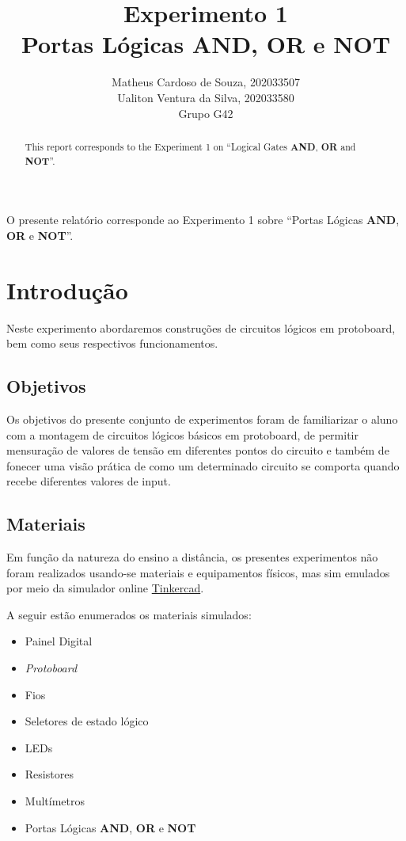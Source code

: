 \documentclass[12pt]{article}
\title{Experimento 1\\
Portas Lógicas AND, OR e NOT}
\author{Matheus Cardoso de Souza, 202033507\\
        Ualiton Ventura da Silva, 202033580\\
        Grupo G42
}
\begin{document}
 
\maketitle

 \begin{abstract}
   This report corresponds to the Experiment 1 on ``Logical Gates \textbf{AND}, \textbf{OR} and \textbf{NOT}''.
 \end{abstract}
    
 \begin{resumo} 
  O presente relatório corresponde ao Experimento 1 sobre ``Portas Lógicas \textbf{AND}, \textbf{OR} e \textbf{NOT}''.
 \end{resumo}


\section{Introdução}
\label{sec:Introducao}


Neste experimento abordaremos construções de circuitos lógicos em protoboard, bem como seus respectivos funcionamentos.

\subsection{Objetivos}
\label{sec:Objetivos}

Os objetivos do presente conjunto de experimentos foram de familiarizar o aluno
com a montagem de circuitos lógicos básicos em protoboard, de permitir
mensuração de valores de tensão em diferentes pontos do circuito e também de
fonecer uma visão prática de como um determinado circuito se comporta quando
recebe diferentes valores de input.

\subsection{Materiais} 
\label{sec:Materiais}
Em função da natureza do ensino a distância, os presentes experimentos não foram
realizados usando-se materiais e equipamentos físicos, mas sim emulados por meio
da simulador online \href{https://www.tinkercad.com/}{Tinkercad}.

A seguir estão enumerados os materiais simulados:
\begin{itemize}
    \item Painel Digital
    \item \textit{Protoboard}
    \item Fios
    \item Seletores de estado lógico
    \item LEDs
    \item Resistores
    \item Multímetros
    \item Portas Lógicas \textbf{AND}, \textbf{OR} e \textbf{NOT}
\end{itemize}
\end{document}
